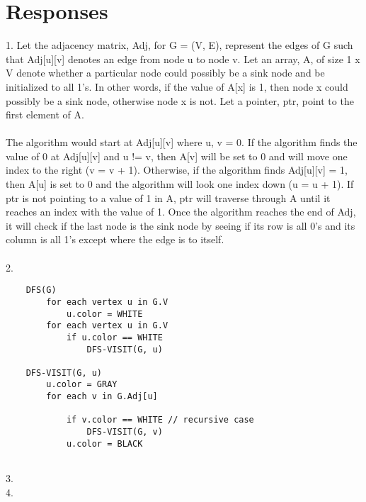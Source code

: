 \documentclass[12pt, a4paper]{article}
\begin{document}
\maketitle

\section{Responses}
1.  Let the adjacency matrix, Adj, for G = (V, E), represent the edges of G such that Adj[u][v] denotes an edge from node u to node v.
Let an array, A, of size 1 x V denote whether a particular node could possibly be a sink node and be initialized to all 1's.
In other words, if the value of A[x] is 1, then node x could possibly be a sink node, otherwise node x is not.
Let a pointer, ptr, point to the first element of A.
\\
\\
The algorithm would start at Adj[u][v] where u, v = 0.
If the algorithm finds the value of 0 at Adj[u][v] and u != v, then A[v] will be set to 0 and will move one index to the right (v = v + 1).
Otherwise, if the algorithm finds Adj[u][v] = 1, then A[u] is set to 0 and the algorithm will look one index down (u = u + 1).
If ptr is not pointing to a value of 1 in A, ptr will traverse through A until it reaches an index with the value of 1.
Once the algorithm reaches the end of Adj, it will check if the last node is the sink node by seeing if its row is all 0's and its column is all 1's except where the edge is to itself.
\\
\\
2. 
\begin{lstlisting}
    DFS(G)
        for each vertex u in G.V
            u.color = WHITE
        for each vertex u in G.V
            if u.color == WHITE
                DFS-VISIT(G, u)
    
    DFS-VISIT(G, u)
        u.color = GRAY
        for each v in G.Adj[u]

            if v.color == WHITE // recursive case 
                DFS-VISIT(G, v)
            u.color = BLACK


\end{lstlisting}
3.
\\
4.
\\
\end{document}
